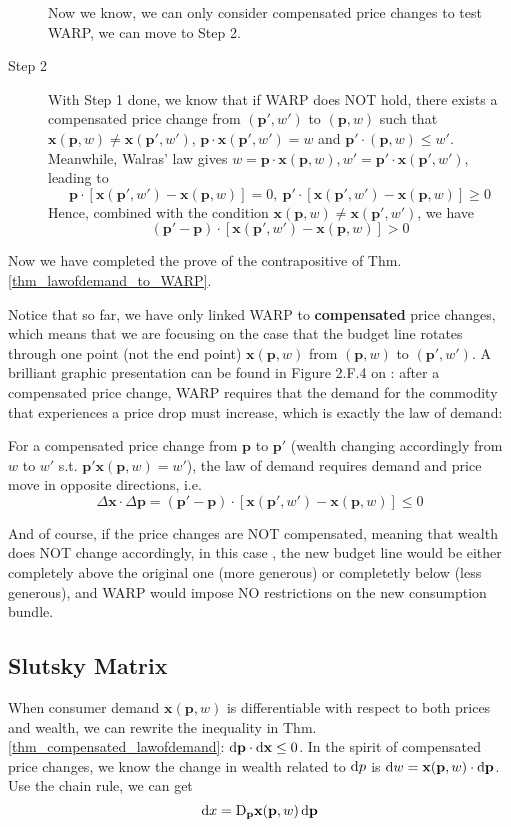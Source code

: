 \begin{description}
    Now we know, we can only consider compensated price changes to test WARP, we can move to Step 2.
    \item[Step 2] With Step 1 done, we know that if WARP does NOT hold, there exists a compensated price change from $(\mathbf{p}',w')$ to $(\mathbf{p},w)$ such that $\mathbf{x}(\mathbf{p},w)\neq \mathbf{x}(\mathbf{p}',w')$, $\mathbf{p}\cdot \mathbf{x}(\mathbf{p}',w')=w$ and $\mathbf{p'}\cdot (\mathbf{p},w)\leq w'$. 
    Meanwhile, Walras' law gives $w= \mathbf{p}\cdot\mathbf{x}(\mathbf{p},w),w'=\mathbf{p}'\cdot\mathbf{x}(\mathbf{p}',w')$, leading to 
    $$\mathbf{p}\cdot\left[\mathbf{x}(\mathbf{p}',w')-\mathbf{x}(\mathbf{p},w)\right]=0,\ \mathbf{p}'\cdot\left[\mathbf{x}(\mathbf{p}',w')-\mathbf{x}(\mathbf{p},w)\right]\geq 0$$
    Hence, combined with the condition $\mathbf{x}(\mathbf{p},w)\neq \mathbf{x}(\mathbf{p}',w')$, we have
    $$(\mathbf{p}'-\mathbf{p})\cdot\left[\mathbf{x}(\mathbf{p}',w')-\mathbf{x}(\mathbf{p},w)\right]> 0$$ 
\end{description}
Now we have completed the prove of the contrapositive of Thm.\ref{thm_lawofdemand_to_WARP}.

Notice that so far, we have only linked WARP to \textbf{compensated} price changes, which means that we are focusing on the case that the budget line rotates through one point (not the end point) $\mathbf{x}(\mathbf{p},w)$ from $(\mathbf{p},w)$ to $(\mathbf{p}',w')$. A brilliant graphic presentation can be found in Figure 2.F.4 on \citet[Page 33]{mas1995microeconomic}: after a compensated price change, WARP requires that the demand for the commodity that experiences a price drop must increase, which is exactly the law of demand:
\begin{theorem}\label{thm_compensated_lawofdemand}
    For a compensated price change from $\mathbf{p}$ to $\mathbf{p}'$ (wealth changing accordingly from $w$ to $w'$ s.t. $\mathbf{p}'\mathbf{x}(\mathbf{p},w)=w'$), the law of demand requires demand and price move in opposite directions, i.e.
    $$\Delta \mathbf{x}\cdot \Delta \mathbf{p} = (\mathbf{p}'-\mathbf{p})\cdot [\mathbf{x}(\mathbf{p}',w')-\mathbf{x}(\mathbf{p},w)]\leq 0$$
\end{theorem}

And of course, if the price changes are NOT compensated, meaning that wealth does NOT change accordingly, in this case \citep[Figure 2.F.5, Page 33]{mas1995microeconomic}, the new budget line would be either completely above the original one (more generous) or completetly below (less generous), and WARP would impose NO restrictions on the new consumption bundle.

\subsection{Slutsky Matrix}
When consumer demand $\mathbf{x}(\mathbf{p},w)$ is differentiable with respect to both prices and wealth, we can rewrite the inequality in Thm.\ref{thm_compensated_lawofdemand}: $\mathop{}\!\mathrm{d} \mathbf{p}\cdot \mathop{}\!\mathrm{d} \mathbf{x}\leq 0$. In the spirit of compensated price changes, we know the change in wealth related to $\mathop{}\!\mathrm{d} p$ is $\mathop{}\!\mathrm{d} w=\mathbf{x}(\mathbf{p},w)\cdot \mathop{}\!\mathrm{d} \mathbf{p}$.
Use the chain rule, we can get
$$\mathop{}\!\mathrm{d} x= \mathop{}\!\mathrm{D}_{\mathbf{p}}\mathbf{x}(\mathbf{p},w)\mathop{}\!\mathrm{d} \mathbf{p}$$
